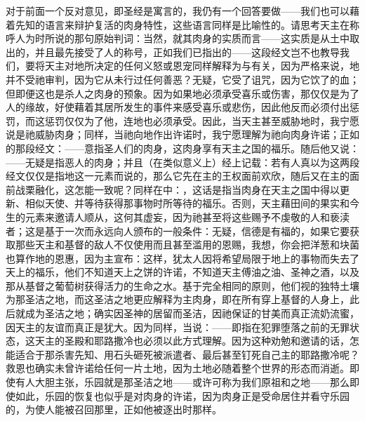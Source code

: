 对于前面一个反对意见，即圣经是寓言的，我仍有一个回答要做——我们也可以藉着先知的语言来辩护复活的肉身特性，这些语言同样是比喻性的。请思考天主在称呼人为时所说的那句原始判词：当然，就其肉身的实质而言——这实质是从土中取出的，并且最先接受了人的称号，正如我们已指出的——这段经文岂不也教导我们，要将天主对地所决定的任何义怒或恩宠同样解释为与有关，因为严格来说，地并不受祂审判，因为它从未行过任何善恶？无疑，它受了诅咒，因为它饮了的血；但即便这也是杀人之肉身的预象。因为如果地必须承受喜乐或伤害，那仅仅是为了人的缘故，好使藉着其居所发生的事件来感受喜乐或悲伤，因此他反而必须付出惩罚，而这惩罚仅仅为了他，连地也必须承受。因此，当天主甚至威胁地时，我宁愿说是祂威胁肉身；同样，当祂向地作出许诺时，我宁愿理解为祂向肉身许诺；正如的那段经文：——意指圣人们的肉身，这肉身享有天主之国的福乐。随后他又说：——无疑是指恶人的肉身；并且（在类似意义上）经上记载：若有人真以为这两段经文仅仅是指地这一元素而说的，那么它先在主的王权面前欢欣，随后又在主的面前战栗融化，这怎能一致呢？同样在中：，这话是指当肉身在天主之国中得以更新、相似天使、并等待获得那事物时所等待的福乐。否则，天主藉田间的果实和今生的元素来邀请人顺从，这何其虚妄，因为祂甚至将这些赐予不虔敬的人和亵渎者；这是基于一次而永远向人颁布的一般条件：无疑，信德是有福的，如果它要获取那些天主和基督的敌人不仅使用而且甚至滥用的恩赐，我想，你会把洋葱和块菌也算作地的恩惠，因为主宣布：这样，犹太人因将希望局限于地上的事物而失去了天上的福乐，他们不知道天上之饼的许诺，不知道天主傅油之油、圣神之酒，以及那从基督之葡萄树获得活力的生命之水。基于完全相同的原则，他们视的独特土壤为那圣洁之地，而这圣洁之地更应解释为主肉身，即在所有穿上基督的人身上，此后就成为圣洁之地；确实因圣神的居留而圣洁，因祂保证的甘美而真正流奶流蜜，因天主的友谊而真正是犹大。因为同样，当说：——即指在犯罪堕落之前的无罪状态，这天主的圣殿和耶路撒冷也必须以此方式理解。因为这种劝勉和邀请的话，怎能适合于那杀害先知、用石头砸死被派遣者、最后甚至钉死自己主的耶路撒冷呢？救恩也确实未曾许诺给任何一片土地，因为土地必随着整个世界的形态而消逝。即使有人大胆主张，乐园就是那圣洁之地——或许可称为我们原祖和之地——那么即使如此，乐园的恢复也似乎是对肉身的许诺，因为肉身正是受命居住并看守乐园的，为使人能被召回那里，正如他被逐出时那样。\par

